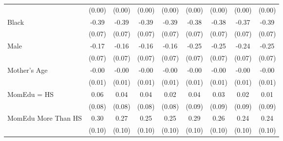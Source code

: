 {\begin{tabular}{l*{8}{c}}
                    &      (0.00)         &      (0.00)         &      (0.00)         &      (0.00)         &      (0.00)         &      (0.00)         &      (0.00)         &      (0.00)         \\
[1em]
Black               &       -0.39\sym{***}&       -0.39\sym{***}&       -0.39\sym{***}&       -0.39\sym{***}&       -0.38\sym{***}&       -0.38\sym{***}&       -0.37\sym{***}&       -0.39\sym{***}\\
                    &      (0.07)         &      (0.07)         &      (0.07)         &      (0.07)         &      (0.07)         &      (0.07)         &      (0.07)         &      (0.07)         \\
[1em]
Male                &       -0.17\sym{**} &       -0.16\sym{**} &       -0.16\sym{**} &       -0.16\sym{**} &       -0.25\sym{***}&       -0.25\sym{***}&       -0.24\sym{***}&       -0.25\sym{***}\\
                    &      (0.07)         &      (0.07)         &      (0.07)         &      (0.07)         &      (0.07)         &      (0.07)         &      (0.07)         &      (0.07)         \\
[1em]
Mother's Age        &       -0.00         &       -0.00         &       -0.00         &       -0.00         &       -0.00         &       -0.00         &       -0.00         &       -0.00         \\
                    &      (0.01)         &      (0.01)         &      (0.01)         &      (0.01)         &      (0.01)         &      (0.01)         &      (0.01)         &      (0.01)         \\
[1em]
MomEdu = HS         &        0.06         &        0.04         &        0.04         &        0.02         &        0.04         &        0.03         &        0.02         &        0.01         \\
                    &      (0.08)         &      (0.08)         &      (0.08)         &      (0.08)         &      (0.09)         &      (0.09)         &      (0.09)         &      (0.09)         \\
[1em]
MomEdu More Than HS &        0.30\sym{***}&        0.27\sym{***}&        0.25\sym{***}&        0.25\sym{***}&        0.29\sym{***}&        0.26\sym{**} &        0.24\sym{**} &        0.24\sym{**} \\
                    &      (0.10)         &      (0.10)         &      (0.10)         &      (0.10)         &      (0.10)         &      (0.10)         &      (0.10)         &      (0.10)         \\

\end{tabular}}
